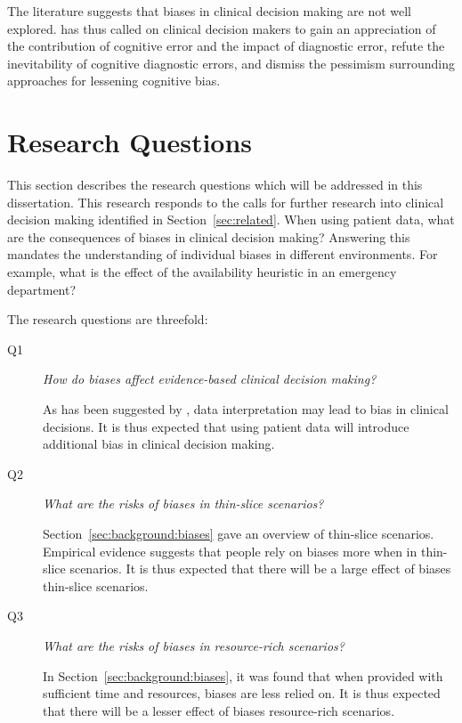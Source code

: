 \documentclass[a4paper]{scrartcl}     %
\newif\ifbreaksection
\begin{document}
  The literature suggests that biases in clinical decision making are not well explored. \citet{Croskerry2003} has thus called on clinical decision makers to gain an appreciation of the contribution of cognitive error and the impact of diagnostic error, refute the inevitability of cognitive diagnostic errors, and dismiss the pessimism surrounding approaches for lessening cognitive bias.







\ifbreaksection\clearpage\fi\section{Research Questions}\label{sec:qs} %

  This section describes the research questions which will be addressed in this dissertation. This research responds to the calls for further research into clinical decision making identified in Section~\ref{sec:related}. When using patient data, what are the consequences of biases in clinical decision making? Answering this mandates the understanding of individual biases in different environments. For example, what is the effect of the availability heuristic in an emergency department?

  The research questions are threefold:

  \begin{description}
    \item[Q1] \textit{How do biases affect evidence-based clinical decision making?}
    \begin{addmargin}[1.9em]{0em}
      As has been suggested by \citet{Graber2002}, data interpretation may lead to bias in clinical decisions. It is thus expected that using patient data will introduce additional bias in clinical decision making.
    \end{addmargin}
    \item[Q2] \textit{What are the risks of biases in thin-slice scenarios?}
    \begin{addmargin}[1.9em]{0em}
      Section~\ref{sec:background:biases} gave an overview of thin-slice scenarios. Empirical evidence suggests that people rely on biases more when in thin-slice scenarios. It is thus expected that there will be a large effect of biases thin-slice scenarios.
    \end{addmargin}
    \item[Q3] \textit{What are the risks of biases in resource-rich scenarios?}
    \begin{addmargin}[1.9em]{0em}
      In Section~\ref{sec:background:biases}, it was found that when provided with sufficient time and resources, biases are less relied on. It is thus expected that there will be a lesser effect of biases resource-rich scenarios.
    \end{addmargin}
  \end{description}
\end{document}
